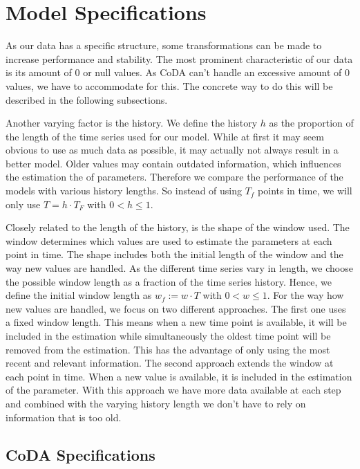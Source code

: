 \section{Model Specifications}
\label{sec: Model Specification}

As our data has a specific structure, some transformations can be made to increase performance and stability. The most prominent characteristic of our data is its amount of 0 or null values. As CoDA can't handle an excessive amount of 0 values, we have to accommodate for this. The concrete way to do this will be described in the following subsections. 

Another varying factor is the history. We define the history $h$ as the proportion of the length of the time series used for our model. While at first it may seem obvious to use as much data as possible, it may actually not always result in a better model. Older values may contain outdated information, which influences the estimation the of parameters. Therefore we compare the performance of the models with various history lengths. So instead of using $T_f$ points in time, we will only use $T=h\cdot T_F$ with $0 < h \leq 1$. 

Closely related to the length of the history, is the shape of the window used. The window determines which values are used to estimate the parameters at each point in time. The shape includes both the initial length of the window and the way new values are handled. As the different time series vary in length, we choose the possible window length as a fraction of the time series history. Hence, we define the initial window length as $w_f:=w \cdot T$ with $0 < w \leq 1$. For the way how new values are handled, we focus on two different approaches. The first one uses a fixed window length. This means when a new time point is available, it will be included in the estimation while simultaneously the oldest time point will be removed from the estimation. This has the advantage of only using the most recent and relevant information. The second approach extends the window at each point in time. When a new value is available, it is included in the estimation of the parameter. With this approach we have more data available at each step and combined with the varying history length we don't have to rely on information that is too old.

\subsection{CoDA Specifications}
\label{sec: Coda Specifications}

